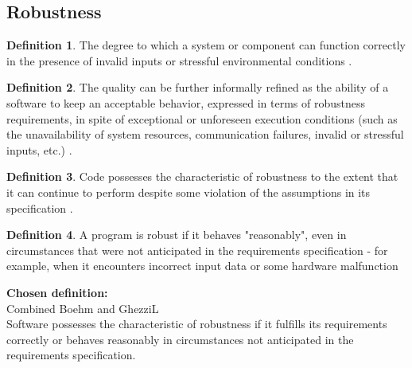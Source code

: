 \documentclass[letterpaper,cleveref]{lipics-v2019}
\theoremstyle{definition}
\newtheorem{defn}{Definition}
\begin{document}
\subsection{Robustness}
\begin{defn}
The degree to which a system or component can function correctly in the presence of invalid inputs or stressful environmental conditions \cite{IEEEStdGlossarySET1990}.\\
\end{defn}
\begin{defn}
The quality can be further informally refined as the ability of a software to keep an acceptable behavior, expressed in terms of robustness requirements, in spite of exceptional or unforeseen execution conditions (such as the unavailability of system resources, communication failures, invalid or stressful inputs, etc.) \cite{fernandez2005model}.\\
\end{defn}
\begin{defn}
Code possesses the characteristic of robustness to the extent that it can continue to perform despite some violation of the assumptions in its specification \cite{boehm2007software}.
\end{defn}
\begin{defn}
A program is robust if it behaves "reasonably", even in circumstances that were not anticipated in the requirements specification - for example, when it encounters incorrect input data or some hardware malfunction \cite{ghezzi1991fundamentals}\\
\end{defn}

\textbf{Chosen definition:}\\
Combined Boehm and GhezziL\\
Software possesses the characteristic of robustness if it fulfills its requirements correctly or behaves reasonably in circumstances not anticipated in the requirements specification.\\
\end{document}
